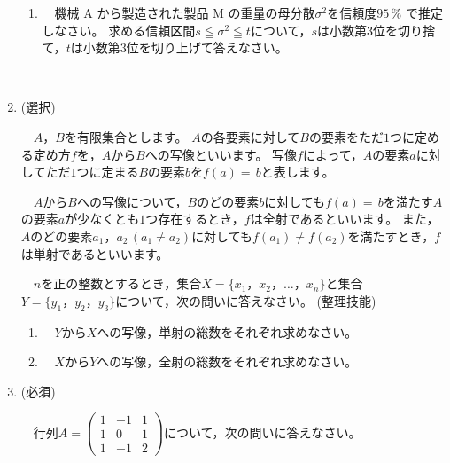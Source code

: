 \documentclass[dvipdfmx, 11pt]{jsarticle}
\renewcommand{\(}[0]{\left(}
\renewcommand{\)}[0]{\right)}
\renewcommand{\[}[0]{\left[}
\renewcommand{\]}[0]{\right]}
\begin{document}
\begin{enumerate}
\begin{enumerate}
		\item
		　機械\! A \!から製造された製品\! M \!の重量の母分散$\sigma^2$を信頼度$95\, \%$ で推定しなさい。
		求める信頼区間$s \leqq \sigma^2 \leqq t$について，$s$は小数第$3$位を切り捨て，$t$は小数第$3$位を切り上げて答えなさい。
	\end{enumerate}
	
	\ \\[32pt]
	

	\item \quad (選択)
	
	　$\! A$，$B \!$を有限集合とします。
	$A \!$の各要素に対して$\! B \!$の要素をただ$1$つに定める定め方$\! f \!$を，$A$から$B$への写像といいます。
	写像$f$によって，$A$の要素$a$に対してただ$1$つに定まる$B$の要素$b$を$f(a)$$=$$\, b$と表します。
	
	　$A$から$B \!$への写像について，$B \!$のどの要素$b$に対しても$f(a)$$=$$\, b$を満たす$\! A \!$の要素$a$が少なくとも$1$つ存在するとき，$\! f \!$は全射であるといいます。
	また，$\! A \!$のどの要素$a_1$，$a_2 \, (a_1 \neq a_2)$に対しても$f(a_1)$$\neq$$f(a_2)$を満たすとき，$f$は単射であるといいます。
	
	　$n$を正の整数とするとき，集合$X = \{ x_1，x_2，…，x_n \}$と集合$Y = \{ y_1，y_2，y_3 \}$について，次の問いに答えなさい。
	\hspace{\fill} (整理技能)
	
	\begin{enumerate}
		\item
		　$Y$から$X$への写像，単射の総数をそれぞれ求めなさい。\\
		
		\item
		　$X$から$Y$への写像，全射の総数をそれぞれ求めなさい。
	\end{enumerate}

	\newpage
	

	\item \quad (必須)
	
	\renewcommand{\arraystretch}{0.7}
	　行列$A = \begin{pmatrix} 1 & -1 & 1\\ 1 & 0 & 1 \\ 1 & -1 & 2 \end{pmatrix}$について，次の問いに答えなさい。\\
	

\end{enumerate}
\end{document}
